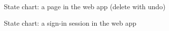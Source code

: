 \begin{figure}[H]
\centering

\caption{State chart: a page in the web app (delete with undo)}
\label{fig:state-page}
\end{figure}

\begin{figure}[H]
\centering

\caption{State chart: a sign-in session in the web app}
\label{fig:state-session}
\end{figure}
